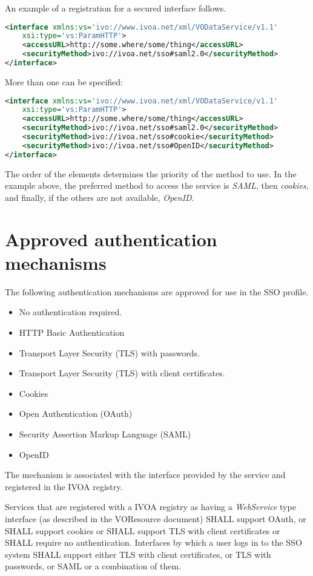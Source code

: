 \documentclass[11pt,a4paper]{ivoa}
\begin{document}
An example of a registration for a secured interface follows.
\begin{lstlisting}[language=XML]
<interface xmlns:vs='ivo://www.ivoa.net/xml/VODataService/v1.1'  
	xsi:type='vs:ParamHTTP'>
	<accessURL>http://some.where/some/thing</accessURL>
	<securityMethod>ivo://ivoa.net/sso#saml2.0</securityMethod>
</interface> 
\end{lstlisting}

More than one  can be specified:
\begin{lstlisting}[language=XML]
<interface xmlns:vs='ivo://www.ivoa.net/xml/VODataService/v1.1'  
	xsi:type='vs:ParamHTTP'>
	<accessURL>http://some.where/some/thing</accessURL>
	<securityMethod>ivo://ivoa.net/sso#saml2.0</securityMethod>
	<securityMethod>ivo://ivoa.net/sso#cookie</securityMethod>
	<securityMethod>ivo://ivoa.net/sso#OpenID</securityMethod>
</interface> 
\end{lstlisting}


The order of the  elements determines the priority of
the method to use.  In the example above, the preferred method to access
the service is  {\em SAML}, then {\em cookies}, and finally, if the others are not available,
{\em OpenID}.

\section{Approved authentication mechanisms}

The following authentication mechanisms are approved for use in the SSO profile.
\begin{itemize}
\item No authentication required.
\item HTTP Basic Authentication
\item Transport Layer Security (TLS) with passwords.
\item Transport Layer Security (TLS) with client certificates.
\item Cookies
\item Open Authentication (OAuth) 
\item Security Assertion Markup Language (SAML) 
\item OpenID 
\end{itemize}

The mechanism is associated with the interface provided by the service and registered in the IVOA registry.

Services that are registered with a IVOA registry as having a {\em WebService} type interface (as 
described in the VOResource document) SHALL support OAuth, or SHALL support cookies or SHALL support TLS with client 
certificates or SHALL require no authentication.
Interfaces by which a user logs in to the SSO system SHALL support either 
TLS with client certificates, or TLS with passwords, or SAML or a combination of  them.
\end{document}
